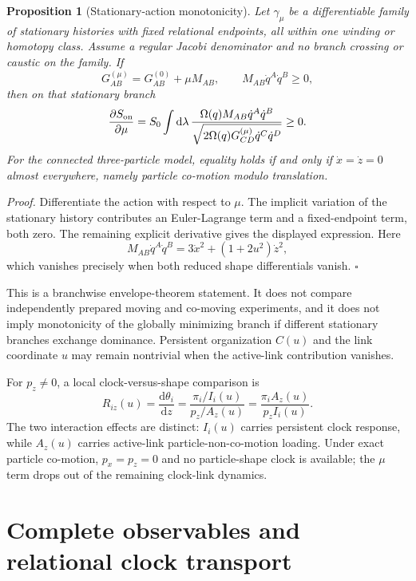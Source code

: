 \documentclass[11pt]{article}
\theoremstyle{plain}
\newtheorem{proposition}[theorem]{Proposition}
\newcommand{\dd}{\mathrm d}
\newcommand{\QED}{\hfill$\square$}
\begin{document}
\begin{proposition}[Stationary-action monotonicity]
Let $\gamma_\mu$ be a differentiable family of stationary histories with fixed relational endpoints, all within one winding or homotopy class. Assume a regular Jacobi denominator and no branch crossing or caustic on the family. If
\begin{equation}
G_{AB}^{(\mu)}=G_{AB}^{(0)}+\mu M_{AB},\qquad M_{AB}\dot q^A\dot q^B\ge0,
\end{equation}
then on that stationary branch
\begin{equation}
\frac{\partial S_{\rm on}}{\partial\mu}=S_0\int\dd\lambda\,
\frac{\Omega(q)M_{AB}\dot q^A\dot q^B}{\sqrt{2\Omega(q)G_{CD}^{(\mu)}\dot q^C\dot q^D}}\ge0.
\end{equation}
For the connected three-particle model, equality holds if and only if $\dot x=\dot z=0$ almost everywhere, namely particle co-motion modulo translation.
\end{proposition}
\noindent\emph{Proof.} Differentiate the action with respect to $\mu$. The implicit variation of the stationary history contributes an Euler-Lagrange term and a fixed-endpoint term, both zero. The remaining explicit derivative gives the displayed expression. Here
\begin{equation}
M_{AB}\dot q^A\dot q^B=3\dot x^2+(1+2u^2)\dot z^2,
\end{equation}
which vanishes precisely when both reduced shape differentials vanish. \QED

This is a branchwise envelope-theorem statement. It does not compare independently prepared moving and co-moving experiments, and it does not imply monotonicity of the globally minimizing branch if different stationary branches exchange dominance. Persistent organization $C(u)$ and the link coordinate $u$ may remain nontrivial when the active-link contribution vanishes.

For $p_z\ne0$, a local clock-versus-shape comparison is
\begin{equation}
R_{iz}(u)=\frac{\dd\theta_i}{\dd z}=\frac{\pi_i/I_i(u)}{p_z/A_z(u)}=\frac{\pi_iA_z(u)}{p_zI_i(u)}.
\end{equation}
The two interaction effects are distinct: $I_i(u)$ carries persistent clock response, while $A_z(u)$ carries active-link particle-non-co-motion loading. Under exact particle co-motion, $p_x=p_z=0$ and no particle-shape clock is available; the $\mu$ term drops out of the remaining clock-link dynamics.

\section{Complete observables and relational clock transport}
\end{document}
